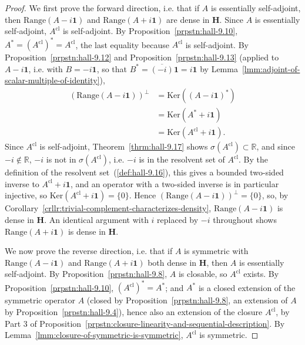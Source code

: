 \begin{proof}
    \leanok
We first prove the forward direction, i.e. that if $A$ is essentially self-adjoint, then $\text{Range}(A - i\mathbf{1})$ and $\text{Range}(A + i\mathbf{1})$ are dense in $\mathbf{H}$. Since $A$ is essentially self-adjoint, $A^{\text{cl}}$ is self-adjoint. By Proposition~\ref{prpstn:hall-9.10}, $A^* = (A^{\text{cl}})^* = A^{\text{cl}}$, the last equality because $A^{\text{cl}}$ is self-adjoint. By Proposition~\ref{prpstn:hall-9.12} and Proposition~\ref{prpstn:hall-9.13} (applied to $A - i\mathbf{1}$, i.e. with $B = -i\mathbf{1}$, so that $B^* = \overline{(-i)}\mathbf{1} = i\mathbf{1}$ by Lemma~\ref{lmm:adjoint-of-scalar-multiple-of-identity}),
\begin{align}
    \left( \text{Range}(A - i\mathbf{1}) \right)^\perp &= \text{Ker}\left( (A - i\mathbf{1})^* \right) \\
                &= \text{Ker}(A^* + i\mathbf{1}) \\
                &= \text{Ker}(A^{\text{cl}} + i\mathbf{1}).
\end{align}
Since $A^{\text{cl}}$ is self-adjoint, Theorem~\ref{thrm:hall-9.17} shows $\sigma(A^{\text{cl}}) \subset \mathbb{R}$, and since $-i \notin \mathbb{R}$, $-i$ is not in $\sigma(A^{\text{cl}})$, i.e. $-i$ is in the resolvent set of $A^{\text{cl}}$. By the definition of the resolvent set~(\ref{def:hall-9.16}), this gives a bounded two-sided inverse to $A^{\text{cl}} + i\mathbf{1}$, and an operator with a two-sided inverse is in particular injective, so $\text{Ker}(A^{\text{cl}} + i\mathbf{1}) = \{0\}$. Hence $\left( \text{Range}(A - i\mathbf{1}) \right)^\perp = \{0\}$, so, by Corollary~\ref{crllr:trivial-complement-characterizes-density}, $\text{Range}(A - i\mathbf{1})$ is dense in $\mathbf{H}$. An identical argument with $i$ replaced by $-i$ throughout shows $\text{Range}(A + i\mathbf{1})$ is dense in $\mathbf{H}$.

We now prove the reverse direction, i.e. that if $A$ is symmetric with $\text{Range}(A - i\mathbf{1})$ and $\text{Range}(A + i\mathbf{1})$ both dense in $\mathbf{H}$, then $A$ is essentially self-adjoint. By Proposition~\ref{prpstn:hall-9.8}, $A$ is closable, so $A^{\text{cl}}$ exists. By Proposition~\ref{prpstn:hall-9.10}, $(A^{\text{cl}})^* = A^*$; and $A^*$ is a closed extension of the symmetric operator $A$ (closed by Proposition~\ref{prpstn:hall-9.8}, an extension of $A$ by Proposition~\ref{prpstn:hall-9.4}), hence also an extension of the closure $A^{\text{cl}}$, by Part 3 of Proposition~\ref{prpstn:closure-linearity-and-sequential-description}. By Lemma~\ref{lmm:closure-of-symmetric-is-symmetric}, $A^{\text{cl}}$ is symmetric.


\end{proof}
